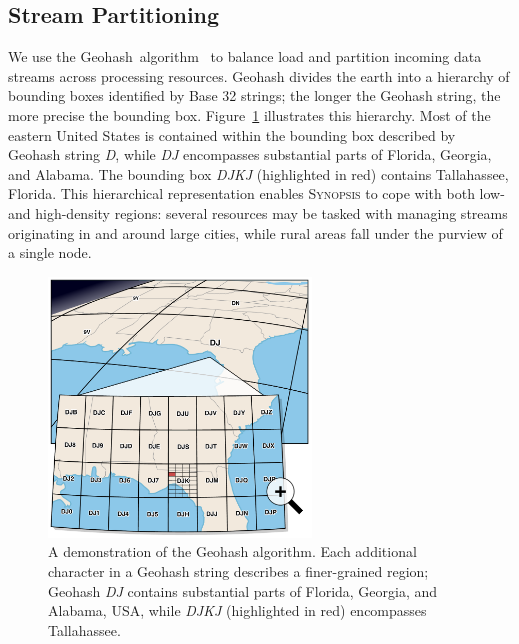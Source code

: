 \subsection{Stream Partitioning}
We use the Geohash~algorithm~\cite{geohash} to balance load and partition incoming data streams across processing resources. Geohash divides the earth into a hierarchy of bounding boxes identified by Base 32 strings; the longer the Geohash string, the more precise the bounding box. Figure~\ref{fig:geohash} illustrates this hierarchy. Most of the eastern United States is contained within the bounding box described by Geohash string \emph{D}, while \emph{DJ} encompasses substantial parts of Florida, Georgia, and Alabama. The bounding box \emph{DJKJ} (highlighted in red) contains Tallahassee, Florida. This hierarchical representation enables \textsc{Synopsis} to cope with both low- and high-density regions: several resources may be tasked with managing streams originating in and around large cities, while rural areas fall under the purview of a single node.

\begin{figure}[b!]
    \centerline{\includegraphics[width=2.75in]{figures/geohash.pdf}}
    \caption{A demonstration of the Geohash algorithm. Each additional character in a Geohash string describes a finer-grained region; Geohash \emph{DJ} contains substantial parts of Florida, Georgia, and Alabama, USA, while \emph{DJKJ} (highlighted in red) encompasses Tallahassee.}
    \label{fig:geohash}
\end{figure}

